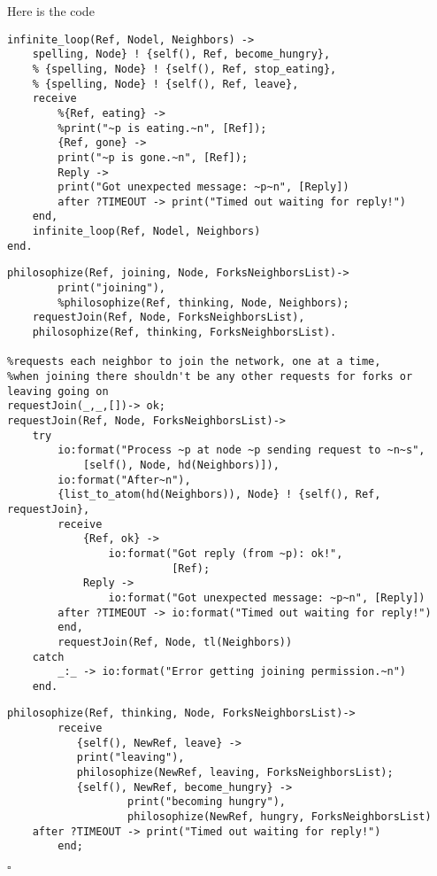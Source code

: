 \documentclass[11pt]{article}
\newenvironment{solution}{\noindent{\bf Solution.} }{

\hfill$\square$}
\begin{document}
\begin{solution}

\item Here is the code
\begin{lstlisting}
infinite_loop(Ref, Nodel, Neighbors) ->
    spelling, Node} ! {self(), Ref, become_hungry},
    % {spelling, Node} ! {self(), Ref, stop_eating},
    % {spelling, Node} ! {self(), Ref, leave},
    receive
        %{Ref, eating} ->          
        %print("~p is eating.~n", [Ref]);
        {Ref, gone} ->
        print("~p is gone.~n", [Ref]);
        Reply ->
        print("Got unexpected message: ~p~n", [Reply])
        after ?TIMEOUT -> print("Timed out waiting for reply!")
    end,
    infinite_loop(Ref, Nodel, Neighbors)
end.
\end{lstlisting}

\begin{lstlisting}
philosophize(Ref, joining, Node, ForksNeighborsList)->
        print("joining"),
        %philosophize(Ref, thinking, Node, Neighbors);
    requestJoin(Ref, Node, ForksNeighborsList),
    philosophize(Ref, thinking, ForksNeighborsList).
    
%requests each neighbor to join the network, one at a time,
%when joining there shouldn't be any other requests for forks or leaving going on
requestJoin(_,_,[])-> ok;
requestJoin(Ref, Node, ForksNeighborsList)->
    try
        io:format("Process ~p at node ~p sending request to ~n~s",
            [self(), Node, hd(Neighbors)]),
        io:format("After~n"),
        {list_to_atom(hd(Neighbors)), Node} ! {self(), Ref, requestJoin},
        receive
            {Ref, ok} ->
                io:format("Got reply (from ~p): ok!",
                          [Ref);
            Reply ->
                io:format("Got unexpected message: ~p~n", [Reply])
        after ?TIMEOUT -> io:format("Timed out waiting for reply!")
        end,
        requestJoin(Ref, Node, tl(Neighbors))
    catch
        _:_ -> io:format("Error getting joining permission.~n")
    end.
\end{lstlisting}

\begin{lstlisting}
philosophize(Ref, thinking, Node, ForksNeighborsList)->
        receive
           {self(), NewRef, leave} ->
           print("leaving"),
           philosophize(NewRef, leaving, ForksNeighborsList);
           {self(), NewRef, become_hungry} ->
                   print("becoming hungry"),
                   philosophize(NewRef, hungry, ForksNeighborsList)
	after ?TIMEOUT -> print("Timed out waiting for reply!")
        end;
\end{lstlisting}


\end{solution}
\end{document}
